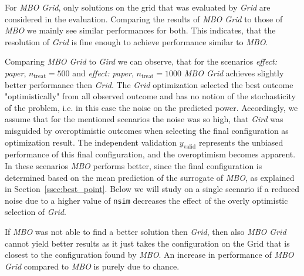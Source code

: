 \documentclass[bimj,fleqn]{w-art}
\theoremstyle{plain}
\theoremstyle{definition}
\begin{document}
For \emph{MBO Grid}, only solutions on the grid that was evaluated by \emph{Grid} are considered in the evaluation. 
Comparing the results of \emph{MBO Grid} to those of \emph{MBO} we mainly see similar performances for both.
This indicates, that the resolution of \emph{Grid} is fine enough to achieve performance similar to \emph{MBO}.

Comparing \emph{MBO Grid} to \emph{Gird} we can observe, that for the scenarios \emph{effect: paper}, $n_{\text{treat}} = 500$ and \emph{effect: paper}, $n_{\text{treat}} = 1000$ \emph{MBO Grid} achieves slightly better performance then \emph{Grid}.
The \emph{Grid} optimization selected the best outcome "optimistically" from all observed outcome and has no notion of the stochasticity of the problem, i.e. in this case the noise on the predicted power. 
Accordingly, we assume that for the mentioned scenarios the noise was so high, that \emph{Gird} was misguided by overoptimistic outcomes when selecting the final configuration as optimization result.
The independent validation $y_{\text{valid}}$ represents the unbiased performance of this final configuration, and the overoptimism becomes apparent.
In these scenarios \emph{MBO} performs better, since the final configuration is determined based on the mean prediction of the surrogate of \emph{MBO}, as explained in Section~\ref{ssec:best_point}.
Below we will study on a single scenario if a reduced noise due to a higher value of \texttt{nsim} decreases the effect of the overly optimistic selection of \emph{Grid}.

If \emph{MBO} was not able to find a better solution then \emph{Grid}, then also \emph{MBO Grid} cannot yield better results as it just takes the configuration on the Grid that is closest to the configuration found by \emph{MBO}.
An increase in performance of \emph{MBO Grid} compared to \emph{MBO} is purely due to chance.
\end{document}
